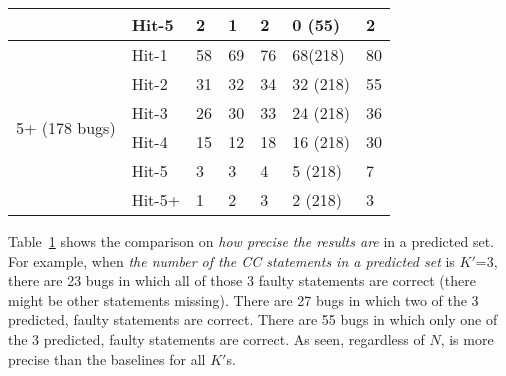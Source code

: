 \begin{table}[t]
{\begin{center}
\begin{tabular}{p{1.5cm}<{\centering}|p{0.8cm}<{\centering}|p{1cm}<{\centering}|p{0.8cm}<{\centering}|p{1.2cm}<{\centering}|p{0.9cm}<{\centering}|p{1.3cm}<{\centering}}
				& Hit-5      						   & 2 & 1 & 2 & 0 (55) &2 \\
				\hline
				\multirow{6}{*}{5+ (178 bugs)}  & Hit-1 & 58 & 69 & 76 & 68(218)& 80 \\
				& Hit-2        				       & 31 & 32 & 34 & 32 (218) &55 \\
				& Hit-3       				       & 26 & 30 & 33 & 24 (218) &36 \\
				& Hit-4      				       & 15 & 12 & 18 & 16 (218)&30 \\
				& Hit-5      				       & 3  & 3 & 4 & 5 (218) &7 \\
				& Hit-5+       				       & 1  & 2 & 3 & 2 (218) & 3 \\
				\hline
			\end{tabular}
			\label{fig:rq1-prec}
		\end{center}
	}
\end{table}

Table~\ref{fig:rq1-prec} shows the comparison on {\em how precise the
results are} in a predicted set. For example, when {\em the number of the
CC statements in a predicted set} is $K'$=3, there are 23 bugs in which
all of those 3 faulty statements are correct (there might be other
statements missing).  There are 27 bugs in which two of the 3
predicted, faulty statements are correct. There are 55 bugs in which
only one of the 3 predicted, faulty statements are correct. As seen,
regardless of $N$, {\tool} is more precise than the baselines for all
$K'$s.









